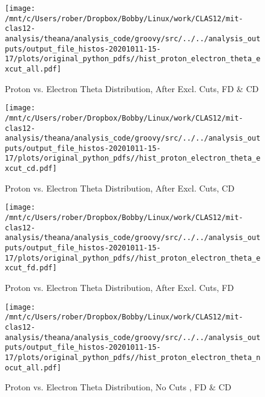 \documentclass{article}
\begin{document}
\begin{landscape}
    \begin{figure}[h]
        \centering

        \texttt{[image: /mnt/c/Users/rober/Dropbox/Bobby/Linux/work/CLAS12/mit-clas12-analysis/theana/analysis\_code/groovy/src/../../analysis\_outputs/output\_file\_histos-20201011-15-17/plots/original\_python\_pdfs//hist\_proton\_electron\_theta\_excut\_all.pdf]}
        \captionsetup{textformat=empty,labelformat=blank}
        \caption{Proton vs. Electron Theta Distribution, After Excl. Cuts, FD \& CD}
    \end{figure}
    \clearpage
    
    \begin{figure}[h]
        \centering

        \texttt{[image: /mnt/c/Users/rober/Dropbox/Bobby/Linux/work/CLAS12/mit-clas12-analysis/theana/analysis\_code/groovy/src/../../analysis\_outputs/output\_file\_histos-20201011-15-17/plots/original\_python\_pdfs//hist\_proton\_electron\_theta\_excut\_cd.pdf]}
        \captionsetup{textformat=empty,labelformat=blank}
        \caption{Proton vs. Electron Theta Distribution, After Excl. Cuts, CD}
    \end{figure}
    \clearpage
    
    \begin{figure}[h]
        \centering

        \texttt{[image: /mnt/c/Users/rober/Dropbox/Bobby/Linux/work/CLAS12/mit-clas12-analysis/theana/analysis\_code/groovy/src/../../analysis\_outputs/output\_file\_histos-20201011-15-17/plots/original\_python\_pdfs//hist\_proton\_electron\_theta\_excut\_fd.pdf]}
        \captionsetup{textformat=empty,labelformat=blank}
        \caption{Proton vs. Electron Theta Distribution, After Excl. Cuts, FD}
    \end{figure}
    \clearpage
    
    \begin{figure}[h]
        \centering

        \texttt{[image: /mnt/c/Users/rober/Dropbox/Bobby/Linux/work/CLAS12/mit-clas12-analysis/theana/analysis\_code/groovy/src/../../analysis\_outputs/output\_file\_histos-20201011-15-17/plots/original\_python\_pdfs//hist\_proton\_electron\_theta\_nocut\_all.pdf]}
        \captionsetup{textformat=empty,labelformat=blank}
        \caption{Proton vs. Electron Theta Distribution, No Cuts , FD \& CD}
    \end{figure}
    \clearpage
    
    \begin{figure}[h]
        \centering


\end{figure}
\end{landscape}
\end{document}
